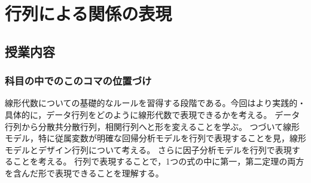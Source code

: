 \section{行列による関係の表現}
\subsection{授業内容}
\subsubsection{科目の中でのこのコマの位置づけ}
線形代数についての基礎的なルールを習得する段階である。今回はより実践的・具体的に，データ行列をどのように線形代数で表現できるかを考える。
データ行列から分散共分散行列，相関行列へと形を変えることを学ぶ。
つづいて線形モデル，特に従属変数が明確な回帰分析モデルを行列で表現することを見，線形モデルとデザイン行列について考える。
さらに因子分析モデルを行列で表現することを考える。
行列で表現することで，1つの式の中に第一，第二定理の両方を含んだ形で表現できることを理解する。

